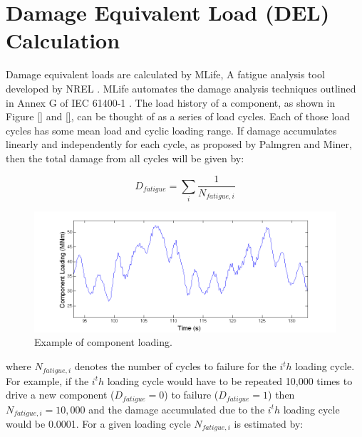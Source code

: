 
\chapter{Damage Equivalent Load (DEL) Calculation} %

\label{AppendixC} %


Damage equivalent loads are calculated by MLife, A fatigue analysis tool developed by NREL \cite{hayman2012,hayman2012a}. MLife automates the damage analysis techniques outlined in Annex G of IEC 61400-1 \cite{IEC2005}. The load history of a component, as shown in Figure \ref{} and \ref{}, can be thought of as a series of load cycles. Each of those load cycles has some mean load and cyclic loading range. If damage accumulates linearly and independently for each cycle, as proposed by Palmgren \cite{palmgren1924} and Miner\cite{miner1945}, then the total damage from all cycles will be given by:

\begin{equation}
D_{fatigue} = \sum_{i} \frac{1}{N_{fatigue, i}} \label{eqC-1}
\end{equation}

 \begin{figure}[ht]
	\centering
		\includegraphics[width=\linewidth]{Figures/AppendixCFigures/figC-1.png}
	\caption{Example of component loading.}
	\label{figC-1}
\end{figure}



where $N_{fatigue, i}$ denotes the number of cycles to failure for the $i^th$ loading cycle. For example, if the $i^th$ loading cycle would have to be repeated 10,000 times to drive a new component ($D_{fatigue} = 0$) to failure ($D_{fatigue} = 1$) then $N_{fatigue, i} = 10,000$ and the damage accumulated due to the $i^th$ loading cycle would be 0.0001. For a given loading cycle $N_{fatigue, i}$ is estimated by:

